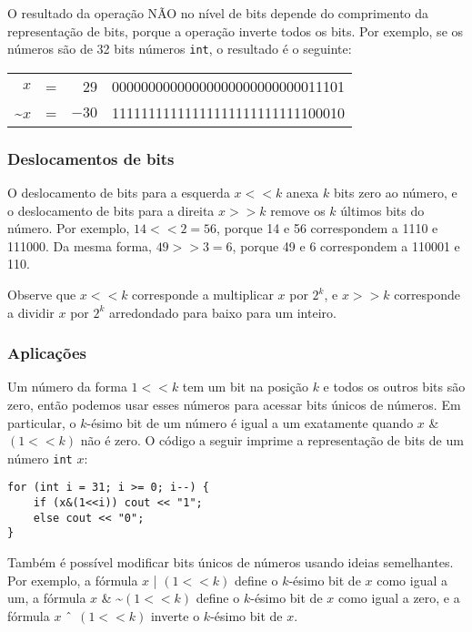 O resultado da operação NÃO no nível de bits
depende do comprimento da representação de bits,
porque a operação inverte todos os bits.
Por exemplo, se os números são de 32 bits
números \texttt{int}, o resultado é o seguinte:

\begin{center}
\begin{tabular}{rrrr}
$x$ & = & 29 &   00000000000000000000000000011101 \\
\textasciitilde$x$ & = & $-30$ & 11111111111111111111111111100010 \\
\end{tabular}
\end{center}

\subsubsection{Deslocamentos de bits}


O deslocamento de bits para a esquerda $x < < k$ anexa $k$
bits zero ao número,
e o deslocamento de bits para a direita $x > > k$
remove os $k$ últimos bits do número.
Por exemplo, $14 < < 2 = 56$,
porque 14 e 56 correspondem a 1110 e 111000.
Da mesma forma, $49 > > 3 = 6$,
porque 49 e 6 correspondem a 110001 e 110.

Observe que $x < < k$
corresponde a multiplicar $x$ por $2^k$,
e $x > > k$
corresponde a dividir $x$ por $2^k$
arredondado para baixo para um inteiro.

\subsubsection{Aplicações}

Um número da forma $1 < < k$ tem um bit
na posição $k$ e todos os outros bits são zero,
então podemos usar esses números para acessar bits únicos de números.
Em particular, o $k$-ésimo bit de um número é igual a um
exatamente quando $x$ \& $(1 < < k)$ não é zero.
O código a seguir imprime a representação de bits
de um número \texttt{int} $x$:

\begin{lstlisting}
for (int i = 31; i >= 0; i--) {
    if (x&(1<<i)) cout << "1";
    else cout << "0";
}
\end{lstlisting}

Também é possível modificar bits únicos
de números usando ideias semelhantes.
Por exemplo, a fórmula $x$ | $(1 < < k)$
define o $k$-ésimo bit de $x$ como igual a um,
a fórmula
$x$ \& \textasciitilde $(1 < < k)$
define o $k$-ésimo bit de $x$ como igual a zero,
e a fórmula
$x$ $\XOR$ $(1 < < k)$
inverte o $k$-ésimo bit de $x$.

